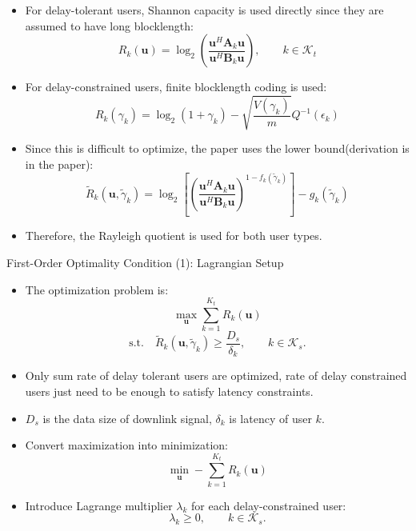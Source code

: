\documentclass{beamer}
\begin{document}
\begin{frame}{}

\begin{itemize}
    \item For delay-tolerant users, Shannon capacity is used directly since they are assumed to have long blocklength:
    \[
        R_k(\mathbf{u})
        =
        \log_2
        \left(
        \frac{\mathbf{u}^H\mathbf{A}_k\mathbf{u}}
        {\mathbf{u}^H\mathbf{B}_k\mathbf{u}}
        \right),
        \qquad k\in\mathcal{K}_t
    \]

    \item For delay-constrained users, finite blocklength coding is used:
    \[
        R_k(\gamma_k)
        =
        \log_2(1+\gamma_k)
        -
        \sqrt{\frac{V(\gamma_k)}{m}}Q^{-1}(\epsilon_k)
    \]

    \item Since this is difficult to optimize, the paper uses the lower bound(derivation is in the paper):
    \[
        \tilde{R}_k(\mathbf{u},\tilde{\gamma}_k)
        =
        \log_2
        \left[
        \left(
        \frac{\mathbf{u}^H\mathbf{A}_k\mathbf{u}}
        {\mathbf{u}^H\mathbf{B}_k\mathbf{u}}
        \right)^{1-f_k(\tilde{\gamma}_k)}
        \right]
        -
        g_k(\tilde{\gamma}_k)
    \]

    \item Therefore, the Rayleigh quotient is used for both user types.
\end{itemize}

\end{frame}

\begin{frame}{First-Order Optimality Condition (1): Lagrangian Setup}
\small

\begin{itemize}
    \item The optimization problem is:
    \[
        \max_{\mathbf{u}}
        \sum_{k=1}^{K_t} R_k(\mathbf{u})
    \]
    \[
        \text{s.t.}
        \quad
        \tilde{R}_k(\mathbf{u},\tilde{\gamma}_k)
        \geq
        \frac{D_s}{\delta_k},
        \qquad k\in\mathcal{K}_s .
    \]
    \item Only sum rate of delay tolerant users are optimized, rate of delay constrained users just need to be enough to satisfy latency constraints.  
    \item $D_s$ is the data size of downlink signal, $\delta_k$ is latency of user $k$.

    \item Convert maximization into minimization:
    \[
        \min_{\mathbf{u}}
        -
        \sum_{k=1}^{K_t} R_k(\mathbf{u})
    \]

    \item Introduce Lagrange multiplier $\lambda_k$ for each delay-constrained user:
    \[
        \lambda_k \geq 0,
        \qquad k\in\mathcal{K}_s .
    \]

\end{itemize}
\end{frame}
\end{document}
